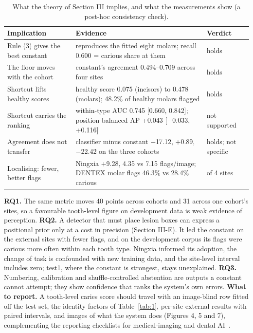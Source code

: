 \documentclass[conference]{IEEEtran}
\begin{document}
\begin{table}[t]
\centering
\caption{What the theory of Section III implies, and what the measurements show (a post-hoc consistency check).}
\label{tab:7}
\footnotesize
\setlength{\tabcolsep}{3pt}
\begin{tabular}{>{\raggedright\arraybackslash}p{4.07cm}>{\raggedright\arraybackslash}p{10.19cm}>{\raggedright\arraybackslash}p{2.48cm}}
\toprule
Implication & Evidence & Verdict \\
\midrule
Rule (3) gives the best constant & reproduces the fitted eight molars; recall 0.600 = carious share at them & holds \\
The floor moves with the cohort & constant's agreement 0.494–0.709 across four sites & holds \\
Shortcut lifts healthy scores & healthy score 0.075 (incisors) to 0.478 (molars); 48.2\% of healthy molars flagged & holds \\
Shortcut carries the ranking & within-type AUC 0.745 [0.660, 0.842]; position-balanced AP +0.043 [$-$0.033, +0.116] & not supported \\
Agreement does not transfer & classifier minus constant +17.12, +0.89, $-$22.42 on the three cohorts & holds; not specific \\
Localising: fewer, better flags & Ningxia +9.28, 4.35 vs 7.15 flags/image; DENTEX molar flags 46.3\% vs 28.4\% carious & 3 of 4 sites \\
\bottomrule
\end{tabular}
\end{table}

\textbf{RQ1.} The same metric moves 40 points across cohorts and 31 across one cohort's sites, so a favourable tooth-level figure on development data is weak evidence of perception. \textbf{RQ2.} A detector that must place lesion boxes can express a positional prior only at a cost in precision (Section III-E). It led the constant on the external sites with fewer flags, and on the development corpus its flags were carious more often within each tooth type. Ningxia informed its adoption, the change of task is confounded with new training data, and the site-level interval includes zero; test1, where the constant is strongest, stays unexplained. \textbf{RQ3.} Numbering, calibration and shuffle-controlled abstention are outputs a constant cannot attempt; they show confidence that ranks the system's own errors. \textbf{What to report.} A tooth-level caries score should travel with an image-blind row fitted off the test set, the identity factors of Table~\ref{tab:1}, per-site external results with paired intervals, and images of what the system does (Figures 4, 5 and 7), complementing the reporting checklists for medical-imaging and dental AI~\cite{mongan2020claim,schwendicke2021checklist}.
\end{document}
